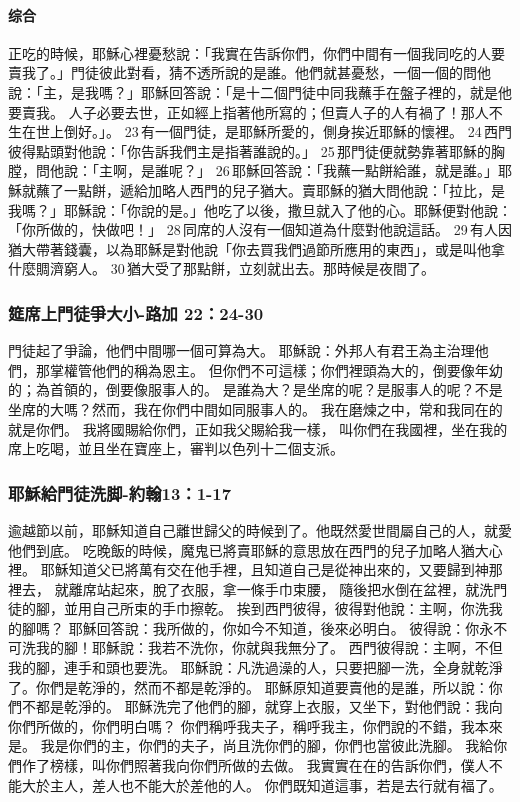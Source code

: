\paragraph{综合}
正吃的時候，耶穌心裡憂愁說：「我實在告訴你們，你們中間有一個我同吃的人要賣我了。」門徒彼此對看，猜不透所說的是誰。他們就甚憂愁，一個一個的問他說：「主，是我嗎？」耶穌回答說：「是十二個門徒中同我蘸手在盤子裡的，就是他要賣我。 人子必要去世，正如經上指著他所寫的；但賣人子的人有禍了！那人不生在世上倒好。」。 23 有一個門徒，是耶穌所愛的，側身挨近耶穌的懷裡。 24 西門彼得點頭對他說：「你告訴我們主是指著誰說的。」 25 那門徒便就勢靠著耶穌的胸膛，問他說：「主啊，是誰呢？」 26 耶穌回答說：「我蘸一點餅給誰，就是誰。」耶穌就蘸了一點餅，遞給加略人西門的兒子猶大。賣耶穌的猶大問他說：「拉比，是我嗎？」耶穌說：「你說的是。」他吃了以後，撒旦就入了他的心。耶穌便對他說：「你所做的，快做吧！」 28 同席的人沒有一個知道為什麼對他說這話。 29 有人因猶大帶著錢囊，以為耶穌是對他說「你去買我們過節所應用的東西」，或是叫他拿什麼賙濟窮人。 30 猶大受了那點餅，立刻就出去。那時候是夜間了。 

\subsubsection{筵席上門徒爭大小-路加 22：24-30}

門徒起了爭論，他們中間哪一個可算為大。
耶穌說：外邦人有君王為主治理他們，那掌權管他們的稱為恩主。
但你們不可這樣；你們裡頭為大的，倒要像年幼的；為首領的，倒要像服事人的。
是誰為大？是坐席的呢？是服事人的呢？不是坐席的大嗎？然而，我在你們中間如同服事人的。
我在磨煉之中，常和我同在的就是你們。
我將國賜給你們，正如我父賜給我一樣，
叫你們在我國裡，坐在我的席上吃喝，並且坐在寶座上，審判以色列十二個支派。


\subsubsection{耶穌給門徒洗脚-約翰13：1-17}

逾越節以前，耶穌知道自己離世歸父的時候到了。他既然愛世間屬自己的人，就愛他們到底。
吃晚飯的時候，魔鬼已將賣耶穌的意思放在西門的兒子加略人猶大心裡。
耶穌知道父已將萬有交在他手裡，且知道自己是從神出來的，又要歸到神那裡去，
就離席站起來，脫了衣服，拿一條手巾束腰，
隨後把水倒在盆裡，就洗門徒的腳，並用自己所束的手巾擦乾。
挨到西門彼得，彼得對他說：主啊，你洗我的腳嗎？
耶穌回答說：我所做的，你如今不知道，後來必明白。
彼得說：你永不可洗我的腳！耶穌說：我若不洗你，你就與我無分了。
西門彼得說：主啊，不但我的腳，連手和頭也要洗。
耶穌說：凡洗過澡的人，只要把腳一洗，全身就乾淨了。你們是乾淨的，然而不都是乾淨的。
耶穌原知道要賣他的是誰，所以說：你們不都是乾淨的。
耶穌洗完了他們的腳，就穿上衣服，又坐下，對他們說：我向你們所做的，你們明白嗎？
你們稱呼我夫子，稱呼我主，你們說的不錯，我本來是。
我是你們的主，你們的夫子，尚且洗你們的腳，你們也當彼此洗腳。
我給你們作了榜樣，叫你們照著我向你們所做的去做。
我實實在在的告訴你們，僕人不能大於主人，差人也不能大於差他的人。
你們既知道這事，若是去行就有福了。
